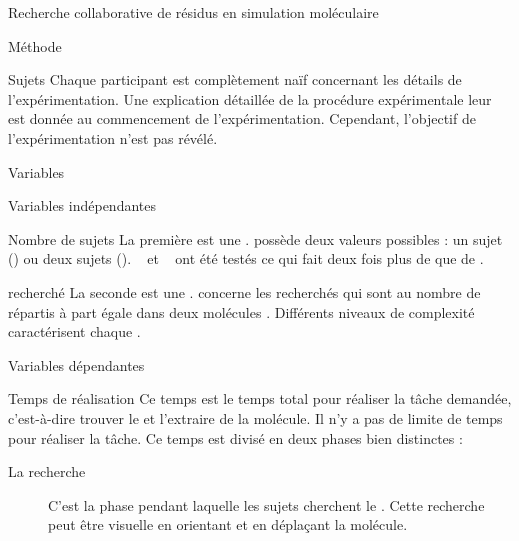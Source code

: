\documentclass[myfrancais]{mythesis}
\begin{document}
\begin{mychapter}{Recherche collaborative de résidus en simulation moléculaire}
\begin{mysection}{Méthode}
\begin{mysubsection}{Sujets}
				Chaque participant est complètement naïf concernant les détails de l'expérimentation.
				Une explication détaillée de la procédure expérimentale leur est donnée au commencement de l'expérimentation.
				Cependant, l'objectif de l'expérimentation n'est pas révélé.
			\end{mysubsection}
			\begin{mysubsection}{Variables}
				\begin{mysubsubsection}{Variables indépendantes}
					\begin{myparagraph}{ Nombre de sujets}
						La première  est une .
						 possède deux valeurs possibles : \og un sujet \fg (\mycf {}) ou \og deux sujets \fg (\mycf {}).
						~ et ~ ont été testés ce qui fait deux fois plus de  que de .
					\end{myparagraph}
					\begin{myparagraph}{  recherché}
						La seconde  est une .
						 concerne les  recherchés qui sont au nombre de  répartis à part égale dans deux molécules .
						Différents niveaux de complexité caractérisent chaque  .
					\end{myparagraph}
				\end{mysubsubsection}
				\begin{mysubsubsection}{Variables dépendantes}
					\begin{myparagraph}{ Temps de réalisation}
						Ce temps est le temps total pour réaliser la tâche demandée, c'est-à-dire trouver le  et l'extraire de la molécule.
						Il n'y a pas de limite de temps pour réaliser la tâche.
						Ce temps est divisé en deux phases bien distinctes :
						\begin{description}
							\item[La recherche] C'est la phase pendant laquelle les sujets cherchent le .
								Cette recherche peut être visuelle en orientant et en déplaçant la molécule.

\end{description}
\end{myparagraph}
\end{mysubsubsection}
\end{mysubsection}
\end{mysection}
\end{mychapter}
\end{document}
